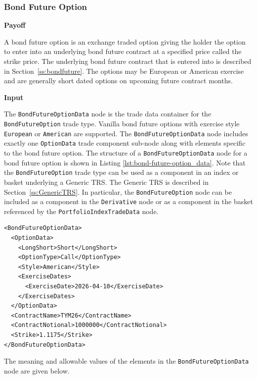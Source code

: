 \subsubsection{Bond Future Option}
\label{ss:input_bond_future_option}

\ifdefined\IncludePayoff
{
\textbf{Payoff}

A bond future option is an exchange traded option giving the holder the option to enter into an underlying bond future 
contract at a specified price called the strike price. The underlying bond future contract that is entered into is 
described in Section~\ref{ss:bondfuture}. The options may be European or American exercise and are generally 
short dated options on upcoming future contract months.

{\bf Input}
}
\fi

The \lstinline!BondFutureOptionData! node is the trade data container for the \lstinline!BondFutureOption! trade type.
Vanilla bond future options with exercise style \lstinline!European! or \lstinline!American! are supported.
The \lstinline!BondFutureOptionData! node includes exactly one \lstinline!OptionData! trade component sub-node 
along with elements specific to the bond future option.
The structure of a \lstinline!BondFutureOptionData! node for a bond future option is shown in 
Listing \ref{lst:bond-future-option_data}.
Note that the \lstinline!BondFutureOption! trade type can be used as a component in an index or basket underlying a 
Generic TRS. The Generic TRS is described in Section~\ref{ss:GenericTRS}. In particular, the 
\lstinline!BondFutureOption! node can be included as a component in the \lstinline!Derivative! node or 
as a component in the basket referenced by the \lstinline!PortfolioIndexTradeData! node.

\begin{listing}[H]
\begin{verbatim}
<BondFutureOptionData>
  <OptionData>
    <LongShort>Short</LongShort>
    <OptionType>Call</OptionType>
    <Style>American</Style>
    <ExerciseDates>
      <ExerciseDate>2026-04-10</ExerciseDate>
    </ExerciseDates>
  </OptionData>
  <ContractName>TYM26</ContractName>
  <ContractNotional>1000000</ContractNotional>
  <Strike>1.1175</Strike>
</BondFutureOptionData>
\end{verbatim}
\caption{Bond Future Option data}
\label{lst:bond-future-option_data}
\end{listing}

The meaning and allowable values of the elements in the \lstinline!BondFutureOptionData! node are given below.

